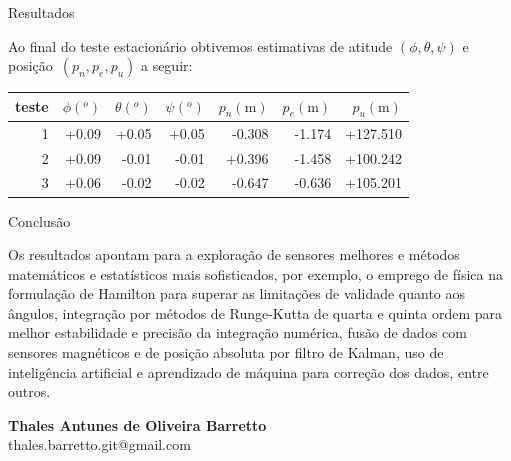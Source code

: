 \documentclass{beamer}
\begin{document}
\begin{frame}{Resultados}

Ao final do teste estacionário obtivemos estimativas de atitude \((\phi,\theta,\psi)\) e posição~\((p_{n},p_{e},p_{u})\) a seguir:

\begin{table}[ht]
    \centering
    \begin{tabular}{r r r r r r r}
        teste & \(\phi (^{o})\) & \(\theta(^{o})\) & \(\psi(^{o})\) & \(p_{n}(\textrm{m})\) & \(p_{e}(\textrm{m})\) & \(p_{u}(\textrm{m})\)  \\
        \toprule
        1 & +0.09 & +0.05 & +0.05 & -0.308 & -1.174 & +127.510  \\
        2 & +0.09 & -0.01 & -0.01 & +0.396 & -1.458 & +100.242  \\
        3 & +0.06 & -0.02 & -0.02 & -0.647 & -0.636 & +105.201  \\
        \bottomrule
    \end{tabular}
    \label{Tab:tabela1}
\end{table}
    
\end{frame}

\begin{frame}{Conclusão}

Os resultados apontam para a exploração de sensores melhores e métodos matemáticos e estatísticos mais sofisticados, por exemplo, o emprego de física na formulação de Hamilton para superar as limitações de validade quanto aos ângulos, integração por métodos de Runge-Kutta de quarta e quinta ordem para melhor estabilidade e precisão da integração numérica, fusão de dados com sensores magnéticos e de posição absoluta por filtro de Kalman, uso de inteligência artificial e aprendizado de máquina para correção dos dados, entre outros.

\end{frame}

\begin{frame}
\begin{centering}
    \normalsize
    {\textbf{Thales Antunes de Oliveira Barretto}}\\

    {\small{thales.barretto.git@gmail.com}}\\
\end{centering}
\end{frame}
\end{document}
